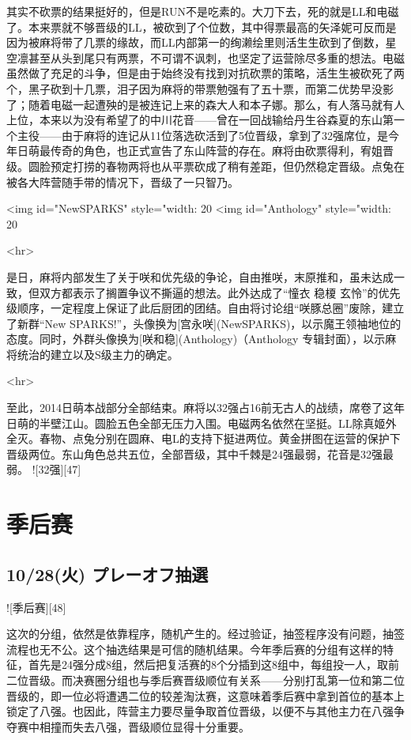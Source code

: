 其实不砍票的结果挺好的，但是RUN不是吃素的。大刀下去，死的就是LL和电磁了。本来票就不够晋级的LL，被砍到了个位数，其中得票最高的矢泽妮可反而是因为被麻将带了几票的缘故，而LL内部第一的绚濑绘里则活生生砍到了倒数，星空凛甚至从头到尾只有两票，不可谓不讽刺，也坚定了运营除尽多重的想法。电磁虽然做了充足的斗争，但是由于始终没有找到对抗砍票的策略，活生生被砍死了两个，黑子砍到十几票，泪子因为麻将的带票勉强有了五十票，而第二优势早没影了；随着电磁一起遭殃的是被连记上来的森大人和本子娜。那么，有人落马就有人上位，本来以为没有希望了的中川花音——曾在一回战输给丹生谷森夏的东山第一个主役——由于麻将的连记从11位落选砍活到了5位晋级，拿到了32强席位，是今年日萌最传奇的角色，也正式宣告了东山阵营的存在。麻将由砍票得利，宥姐晋级。圆脸预定打捞的春物两将也从平票砍成了稍有差距，但仍然稳定晋级。点兔在被各大阵营随手带的情况下，晋级了一只智乃。

<img id="NewSPARKS" style="width: 20%
<img id="Anthology" style="width: 20%

<hr>

是日，麻将内部发生了关于咲和优先级的争论，自由推咲，末原推和，虽未达成一致，但双方都表示了搁置争议不撕逼的想法。此外达成了“憧衣 稳榎 玄怜”的优先级顺序，一定程度上保证了此后厨团的团结。自由将讨论组“咲豚总圈”废除，建立了新群“New SPARKS!”，头像换为[宫永咲](NewSPARKS)，以示魔王领袖地位的态度。同时，外群头像换为[咲和稳](Anthology)（Anthology 专辑封面），以示麻将统治的建立以及S级主力的确定。

<hr>

至此，2014日萌本战部分全部结束。麻将以32强占16前无古人的战绩，席卷了这年日萌的半壁江山。圆脸五色全部无压力入围。电磁两名依然在坚挺。LL除真姬外全灭。春物、点兔分别在圆麻、电L的支持下挺进两位。黄金拼图在运营的保护下晋级两位。东山角色总共五位，全部晋级，其中千棘是24强最弱，花音是32强最弱。
![32强][47]

\chapter{季后赛}

\section{10/28(火) プレーオフ抽選}

![季后赛][48]

这次的分组，依然是依靠程序，随机产生的。经过验证，抽签程序没有问题，抽签流程也无不公。这个抽选结果是可信的随机结果。今年季后赛的分组有这样的特征，首先是24强分成8组，然后把复活赛的8个分插到这8组中，每组投一人，取前二位晋级。而决赛圈分组也与季后赛晋级顺位有关系——分别打乱第一位和第二位晋级的，即一位必将遭遇二位的较差淘汰赛，这意味着季后赛中拿到首位的基本上锁定了八强。也因此，阵营主力要尽量争取首位晋级，以便不与其他主力在八强争夺赛中相撞而失去八强，晋级顺位显得十分重要。

